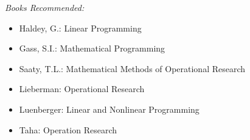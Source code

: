 \documentclass[../main-sheet.tex]{subfiles}
\begin{document}
\emph{Books Recommended:}
\begin{itemize}
    \item Haldey, G.: Linear Programming
    \item Gass, S.I.: Mathematical Programming
    \item Saaty, T.L.: Mathematical Methods of Operational Research
    \item Lieberman: Operational Research
    \item Luenberger: Linear and Nonlinear Programming
    \item  Taha: Operation Research
\end{itemize}
\end{document}
